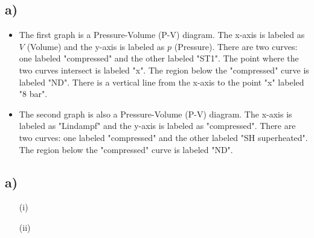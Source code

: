 

\subsection*{a)}

\begin{itemize}
    \item The first graph is a Pressure-Volume (P-V) diagram. The x-axis is labeled as $V$ (Volume) and the y-axis is labeled as $p$ (Pressure). There are two curves: one labeled "compressed" and the other labeled "ST1". The point where the two curves intersect is labeled "x". The region below the "compressed" curve is labeled "ND". There is a vertical line from the x-axis to the point "x" labeled "8 bar".
    \item The second graph is also a Pressure-Volume (P-V) diagram. The x-axis is labeled as "Lindampf" and the y-axis is labeled as "compressed". There are two curves: one labeled "compressed" and the other labeled "SH superheated". The region below the "compressed" curve is labeled "ND".
\end{itemize}



\subsection*{a)}
\begin{itemize}
    \item[(i)] 
    \item[(ii)] 
\end{itemize}